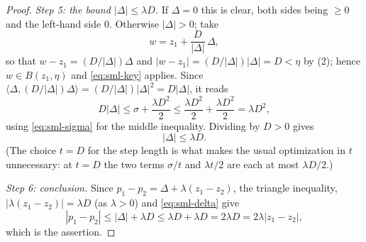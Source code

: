 \begin{proof}
\emph{Step 5: the bound $|\Delta|\le\lambda D$.}
If $\Delta=0$ this is clear, both sides being $\ge0$ and the left-hand side
$0$. Otherwise $|\Delta|>0$; take
\[
  w=z_1+\frac{D}{|\Delta|}\,\Delta ,
\]
so that $w-z_1=(D/|\Delta|)\Delta$ and $|w-z_1|=(D/|\Delta|)|\Delta|=D<\eta$ by
(2); hence $w\in B(z_1,\eta)$ and \eqref{eq:sml-key} applies. Since
$\langle\Delta,(D/|\Delta|)\Delta\rangle=(D/|\Delta|)|\Delta|^2=D|\Delta|$, it
reads
\[
  D|\Delta|\le\sigma+\frac{\lambda D^2}{2}\le\frac{\lambda D^2}{2}
   +\frac{\lambda D^2}{2}=\lambda D^2 ,
\]
using \eqref{eq:sml-sigma} for the middle inequality. Dividing by $D>0$ gives
\begin{equation}\label{eq:sml-delta}
  |\Delta|\le\lambda D .
\end{equation}
(The choice $t=D$ for the step length is what makes the usual optimization in
$t$ unnecessary: at $t=D$ the two terms $\sigma/t$ and $\lambda t/2$ are each
at most $\lambda D/2$.)

\emph{Step 6: conclusion.}
Since $p_1-p_2=\Delta+\lambda(z_1-z_2)$, the triangle inequality,
$|\lambda(z_1-z_2)|=\lambda D$ (as $\lambda>0$) and \eqref{eq:sml-delta} give
\[
  |p_1-p_2|\le|\Delta|+\lambda D\le\lambda D+\lambda D=2\lambda D
   =2\lambda|z_1-z_2| ,
\]
which is the assertion.
\end{proof}
